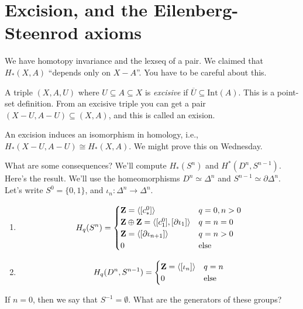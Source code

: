 \section{Excision, and the Eilenberg-Steenrod axioms}
We have homotopy invariance and the lexseq of a pair. We claimed that $ H_\ast(X,A)$ ``depends only on $X-A$''. You have to be careful about this. 
\begin{definition}
A triple $(X,A,U)$ where $U\subseteq A\subseteq X$ is \emph{excisive} if $\overline{U}\subseteq\mathrm{Int}(A)$. This is a point-set definition. From an excisive triple you can get a pair $(X-U,A-U)\subseteq (X,A)$, and this is called an exision.
\end{definition}
\begin{theorem}
An excision induces an isomorphism in homology, i.e., $ H_\ast(X-U,A-U)\cong H_\ast(X,A)$. We might prove this on Wednesday.
\end{theorem}
What are some consequences? We'll compute $ H_\ast(S^n)$ and $ H^\ast(D^n,S^{n-1})$. Here's the result. We'll use the homeomorphisms $D^n\simeq \Delta^n$ and $S^{n-1}\simeq\partial\Delta^n$. Let's write $S^0=\{0,1\}$, and $\iota_n:\Delta^n\to\Delta^n$.
\begin{theorem}
	\begin{enumerate}
	\item \begin{equation*}
	 H_q(S^n)=\begin{cases}\mathbf Z = \langle[c^0_\ast]\rangle & q=0,n>0\\ \mathbf Z\oplus\mathbf Z = \langle[c^0_1],[\partial\iota_1]\rangle & q=n=0 \\ \mathbf Z = \langle[\partial\iota_{n+1}]\rangle & q=n>0 \\ 0 & \text{else} \end{cases}
	\end{equation*}

	\item \begin{equation*}
	 H_q(D^n,S^{n-1}) = \begin{cases}
	\mathbf Z=\langle [\iota_n]\rangle & q=n\\
	0 & \text{else}
	\end{cases}
	\end{equation*}
	\end{enumerate}
\end{theorem}
If $n=0$, then we say that $S^{-1}=\emptyset$. What are the generators of these groups?
